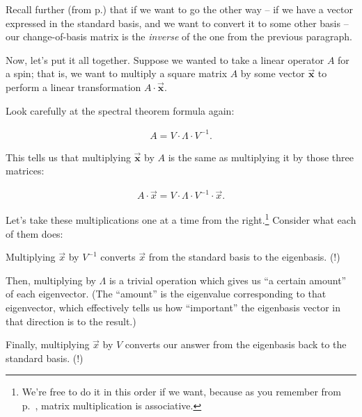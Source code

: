 Recall further (from p.\pageref{changeOfBasisOtherWayFinally}) that if we want
to go the other way -- if we have a vector expressed in the standard basis, and
we want to convert it to some other basis -- our change-of-basis matrix is the
\textit{inverse} of the one from the previous paragraph.

Now, let's put it all together. Suppose we wanted to take a linear operator
$A$ for a spin; that is, we want to multiply a square matrix $A$ by some vector
$\overrightarrow{\textbf{x}}$ to perform a linear transformation $A \cdot
\overrightarrow{\textbf{x}}$.

Look carefully at the spectral theorem formula again:

\vspace{-.15in}
\begin{align*}
A = V \cdot \Lambda \cdot V^{-1}.
\end{align*}
\vspace{-.15in}

This tells us that multiplying $\overrightarrow{\textbf{x}}$ by $A$ is the same
as multiplying it by those three matrices:

\vspace{-.15in}
\begin{align*}
A \cdot \overrightarrow{x} = V \cdot \Lambda \cdot V^{-1} \cdot
\overrightarrow{x}.
\end{align*}
\vspace{-.15in}


Let's take these multiplications one at a time from the right.\footnote{We're
free to do it in this order if we want, because as you remember from
p.~\pageref{associative}, matrix multiplication is associative.} Consider what
each of them does:

\begin{compactenum}

\item Multiplying $\overrightarrow{x}$ by $V^{-1}$ converts
$\overrightarrow{x}$ from the standard basis to the eigenbasis. (!)

\item Then, multiplying by $\Lambda$ is a trivial operation which gives us ``a
certain amount'' of each eigenvector. (The ``amount'' is the eigenvalue
corresponding to that eigenvector, which effectively tells us how ``important''
the eigenbasis vector in that direction is to the result.)

\item Finally, multiplying $\overrightarrow{x}$ by $V$ converts
our answer from the eigenbasis back to the standard basis. (!)

\end{compactenum}


